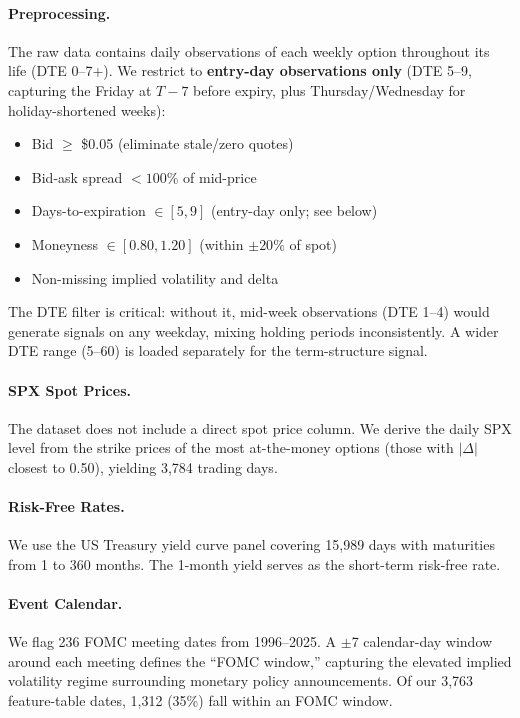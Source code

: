 \documentclass[11pt,a4paper]{article}
\begin{document}
\paragraph{Preprocessing.}
The raw data contains daily observations of each weekly option throughout its life (DTE 0--7+).
We restrict to \textbf{entry-day observations only} (DTE 5--9, capturing the Friday at $T{-}7$ before expiry, plus Thursday/Wednesday for holiday-shortened weeks):
\begin{itemize}[nosep]
    \item Bid $\geq$ \$0.05 (eliminate stale/zero quotes)
    \item Bid-ask spread $< 100\%$ of mid-price
    \item Days-to-expiration $\in [5, 9]$ (entry-day only; see below)
    \item Moneyness $\in [0.80, 1.20]$ (within $\pm20\%$ of spot)
    \item Non-missing implied volatility and delta
\end{itemize}
The DTE filter is critical: without it, mid-week observations (DTE 1--4) would generate signals on any weekday, mixing holding periods inconsistently.
A wider DTE range (5--60) is loaded separately for the term-structure signal.

\paragraph{SPX Spot Prices.}
The dataset does not include a direct spot price column.
We derive the daily SPX level from the strike prices of the most at-the-money options (those with $|\Delta|$ closest to 0.50), yielding 3,784 trading days.

\paragraph{Risk-Free Rates.}
We use the US Treasury yield curve panel covering 15,989 days with maturities from 1 to 360 months.
The 1-month yield serves as the short-term risk-free rate.

\paragraph{Event Calendar.}
We flag 236 FOMC meeting dates from 1996--2025.
A $\pm$7 calendar-day window around each meeting defines the ``FOMC window,'' capturing the elevated implied volatility regime surrounding monetary policy announcements.
Of our 3,763 feature-table dates, 1,312 (35\%) fall within an FOMC window.
\end{document}

